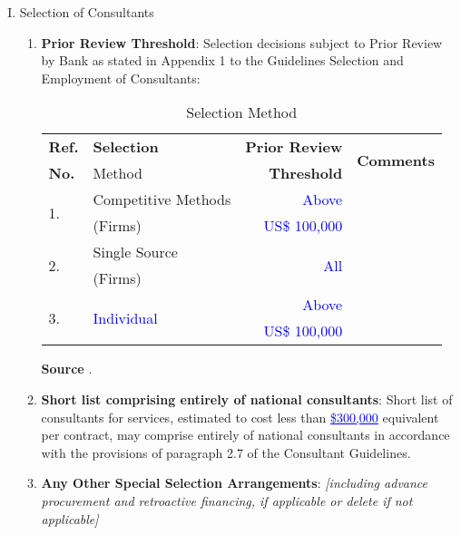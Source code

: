 \begin{enumerate}[I.]
\item Selection of Consultants

\begin{enumerate}[1.]
	\item \textbf{Prior Review Threshold}: Selection decisions subject to Prior Review by Bank as stated in Appendix 1 to the Guidelines Selection and Employment of Consultants:
	\begin{table}[H]
		\caption{Selection Method}
	\begin{center}
		\begin{tabular}{|l|l|r|r|}
				\hline
				\textbf{Ref.}	&  \textbf{Selection}  &  \textbf{Prior Review} & \multirow{2}{*}{\textbf{Comments}} \\
				\textbf{No.}	& Method & \textbf{Threshold}  &  \\
				\hline
	
				\multirow{2}{*}{1.}	& Competitive Methods   &  \textcolor{blue}{Above} &  \\
							& (Firms) & \textcolor{blue}{US\$ 100,000}  &  \\
	
				\multirow{2}{*}{2.}	& Single Source   	&  \multirow{2}{*}{\textcolor{blue}{All}} &  \\
									& (Firms)		&   &  \\
	
				\multirow{2}{*}{3.}	& \multirow{2}{*}{\textcolor{blue}{Individual}}   	&  \textcolor{blue}{Above} &  \\
									& 	   & \textcolor{blue}{US\$ 100,000}  &  \\
				\hline
			\end{tabular}
	\end{center}

	\footnotesize{\textbf{Source} \cite{wb_sample_proc}.}
	\end{table}

	\item \textbf{Short list comprising entirely of national consultants}: Short list of consultants for services, estimated to cost less than \textcolor{blue}{\underline{\$300,000}} equivalent per contract, may comprise entirely of national consultants in accordance with the provisions of paragraph 2.7 of the Consultant Guidelines.

	\item 	\textbf{Any Other Special Selection Arrangements}: \textit{[including advance procurement and retroactive financing, if applicable or delete if not applicable]}


\end{enumerate}
\end{enumerate}
